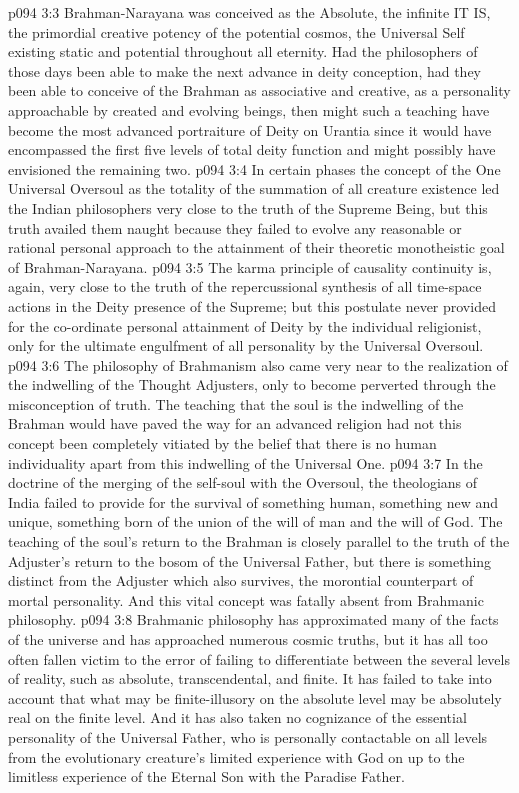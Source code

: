 \vs p094 3:3 Brahman\hyp{}Narayana was conceived as the Absolute, the infinite IT IS, the primordial creative potency of the potential cosmos, the Universal Self existing static and potential throughout all eternity. Had the philosophers of those days been able to make the next advance in deity conception, had they been able to conceive of the Brahman as associative and creative, as a personality approachable by created and evolving beings, then might such a teaching have become the most advanced portraiture of Deity on Urantia since it would have encompassed the first five levels of total deity function and might possibly have envisioned the remaining two.
\vs p094 3:4 In certain phases the concept of the One Universal Oversoul as the totality of the summation of all creature existence led the Indian philosophers very close to the truth of the Supreme Being, but this truth availed them naught because they failed to evolve any reasonable or rational personal approach to the attainment of their theoretic monotheistic goal of Brahman\hyp{}Narayana.
\vs p094 3:5 The karma principle of causality continuity is, again, very close to the truth of the repercussional synthesis of all time\hyp{}space actions in the Deity presence of the Supreme; but this postulate never provided for the co\hyp{}ordinate personal attainment of Deity by the individual religionist, only for the ultimate engulfment of all personality by the Universal Oversoul.
\vs p094 3:6 The philosophy of Brahmanism also came very near to the realization of the indwelling of the Thought Adjusters, only to become perverted through the misconception of truth. The teaching that the soul is the indwelling of the Brahman would have paved the way for an advanced religion had not this concept been completely vitiated by the belief that there is no human individuality apart from this indwelling of the Universal One.
\vs p094 3:7 In the doctrine of the merging of the self\hyp{}soul with the Oversoul, the theologians of India failed to provide for the survival of something human, something new and unique, something born of the union of the will of man and the will of God. The teaching of the soul’s return to the Brahman is closely parallel to the truth of the Adjuster’s return to the bosom of the Universal Father, but there is something distinct from the Adjuster which also survives, the morontial counterpart of mortal personality. And this vital concept was fatally absent from Brahmanic philosophy.
\vs p094 3:8 Brahmanic philosophy has approximated many of the facts of the universe and has approached numerous cosmic truths, but it has all too often fallen victim to the error of failing to differentiate between the several levels of reality, such as absolute, transcendental, and finite. It has failed to take into account that what may be finite\hyp{}illusory on the absolute level may be absolutely real on the finite level. And it has also taken no cognizance of the essential personality of the Universal Father, who is personally contactable on all levels from the evolutionary creature’s limited experience with God on up to the limitless experience of the Eternal Son with the Paradise Father.
